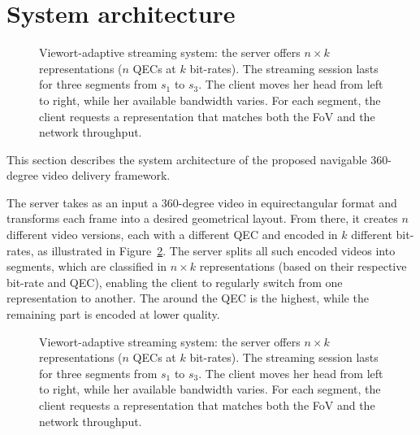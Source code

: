\section{System architecture}

\begin{figure}
   \centering
   
   \caption{Viewort-adaptive streaming system: the server offers $n\times k$ representations ($n$ \acp{QEC} at $k$ bit-rates). The streaming session lasts for three segments from $s_1$ to $s_3$. The client moves her head from left to right, while her available bandwidth varies. For each segment, the client requests a representation that matches both the \ac{FoV} and the network throughput.}
   \label{fig:newdelivery}
\end{figure}

This section describes the system architecture of the proposed
navigable 360-degree video delivery framework.

 The server takes as an input a 360-degree video in
equirectangular format and transforms each frame into a desired
geometrical layout. From there, it creates $n$ different video
versions, each with a different \ac{QEC} and encoded in $k$ different
bit-rates, as illustrated in Figure~\ref{fig:newdelivery}. The server
splits all such encoded videos into segments, which are classified in
$n\!\times\!k$ representations (based on their respective bit-rate and
\ac{QEC}), enabling the client to regularly switch from one
representation to another. The  around the
\ac{QEC} is the highest, while the remaining part is encoded at lower
quality.

\begin{figure}
   \centering
   
   \caption{Viewort-adaptive streaming system: the server offers $n\times k$ representations ($n$ \acp{QEC} at $k$ bit-rates). The streaming session lasts for three segments from $s_1$ to $s_3$. The client moves her head from left to right, while her available bandwidth varies. For each segment, the client requests a representation that matches both the \ac{FoV} and the network throughput.}
   \label{fig:newdelivery}
\end{figure}

